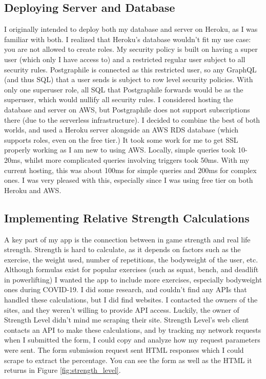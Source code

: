\documentclass{l4proj}
\begin{document}
\subsection{Deploying Server and Database}
I originally intended to deploy both my database and server on Heroku, as I was familiar with both. I realized that Heroku's database wouldn't fit my use case: you are not allowed to create roles. My security policy is built on having a super user (which only I have access to) and a restricted regular user subject to all security rules. Postgraphile is connected as this restricted user, so any GraphQL (and thus SQL) that a user sends is subject to row level security policies. With only one superuser role, all SQL that Postgraphile forwards would be as the superuser, which would nullify all security rules. I considered hosting the database and server on AWS, but Postgraphile does not support subscriptions there (due to the serverless infrastructure). I decided to combine the best of both worlds, and used a Heroku server alongside an AWS RDS database (which supports roles, even on the free tier.) It took some work for me to get SSL properly working as I am new to using AWS. Locally, simple queries took 10-20ms, whilst more complicated queries involving triggers took 50ms. With my current hosting, this was about 100ms for simple queries and 200ms for complex ones. I was very pleased with this, especially since I was using free tier on both Heroku and AWS. 

\subsection{Implementing Relative Strength Calculations} \label{strength_calculations}
A key part of my app is the connection between in game strength and real life strength. Strength is hard to calculate, as it depends on factors such as the exercise, the weight used, number of repetitions, the bodyweight of the user, etc. Although formulas exist for popular exercises (such as squat, bench, and deadlift in powerlifting) I wanted the app to include more exercises, especially bodyweight ones during COVID-19. I did some research, and couldn't find any APIs that handled these calculations, but I did find websites. I contacted the owners of the sites, and they weren't willing to provide API access. Luckily, the owner of Strength Level didn't mind me scraping their site. Strength Level's web client contacts an API to make these calculations, and by tracking my network requests when I submitted the form, I could copy and analyze how my request parameters were sent. The form submission request sent HTML responses which I could scrape to extract the percentage. You can see the form as well as the HTML it returns in Figure \ref{fig:strength_level}.
\end{document}
